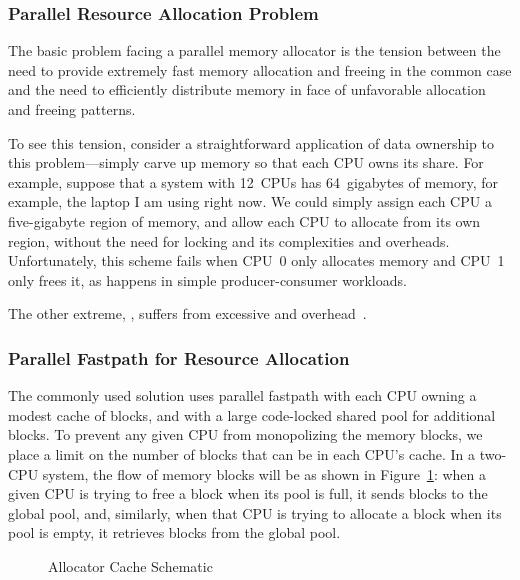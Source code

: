 \subsubsection{Parallel Resource Allocation Problem}

The basic problem facing a parallel memory allocator is the tension
between the need to provide extremely fast memory allocation and
freeing in the common case and the need to efficiently distribute
memory in face of unfavorable allocation and freeing patterns.

To see this tension, consider a straightforward application of
data ownership to this problem---simply carve up memory so that
each CPU owns its share.
For example, suppose that a system with 12~CPUs has 64~gigabytes
of memory, for example, the laptop I am using right now.
We could simply assign each CPU a five-gigabyte region of memory,
and allow each CPU to allocate from its own region, without the need
for locking and its complexities and overheads.
Unfortunately, this scheme fails when CPU~0 only allocates memory and
CPU~1 only frees it, as happens in simple producer-consumer workloads.

The other extreme, , suffers from excessive
and overhead~\cite{McKenney93}.

\subsubsection{Parallel Fastpath for Resource Allocation}
\label{sec:SMPdesign:Parallel Fastpath for Resource Allocation}

The commonly used solution uses parallel fastpath with each CPU
owning a modest cache of blocks, and with a large code-locked
shared pool for additional blocks.
To prevent any given CPU from monopolizing the memory blocks,
we place a limit on the number of blocks that can be in each CPU's
cache.
In a two-CPU system, the flow of memory blocks will be as shown
in Figure~\ref{fig:SMPdesign:Allocator Cache Schematic}:
when a given CPU is trying to free a block when its pool is full,
it sends blocks to the global pool, and, similarly, when that CPU
is trying to allocate a block when its pool is empty, it retrieves
blocks from the global pool.

\begin{figure}
\centering
{}
\caption{Allocator Cache Schematic}
\label{fig:SMPdesign:Allocator Cache Schematic}
\end{figure}

